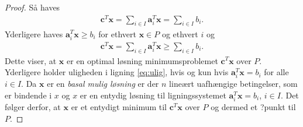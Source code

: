 \begin{proof}
Så haves
%
\begin{align*}
\textbf{c}^T\textbf{x} = \sum_{i\in I}\textbf{a}_i^T\textbf{x} = \sum_{i\in I}b_i.
\end{align*}
%
Yderligere haves $\textbf{a}_i^T\textbf{x} \geq b_i$ for ethvert $\textbf{x} \in P$ og ethvert $i$ og 
%
\begin{align}\label{eq:ulig}
\textbf{c}^T\textbf{x} = \sum_{i\in I}\textbf{a}_i^T\textbf{x} \geq \sum_{i\in I}b_i.
\end{align}
%
Dette viser, at $\textbf{x}$ er en optimal løsning minimumsproblemet $\textbf{c}^T\textbf{x}$ over $P$.
Yderligere holder uligheden i ligning \ref{eq:ulig}, hvis og kun hvis $\textbf{a}_i^T\textbf{x} = b_i$ for alle $i \in I$.
Da $\textbf{x}$ er en \textit{basal mulig løsning} er der $n$ lineært uafhængige betingelser, som er bindende i $x$ og $x$ er en entydig løsning til ligningssystemet $\textbf{a}_i^T\textbf{x} = b_i$, $i \in I$.
Det følger derfor, at $\textbf{x}$ er et entydigt minimum til $\textbf{c}^T\textbf{x}$ over $P$ og dermed et ?punkt til $P$.
%
\end{proof}